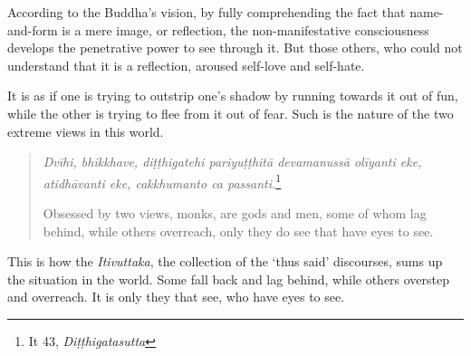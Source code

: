 According to the Buddha's vision, by fully comprehending the fact that name-and-form is a mere image, or reflection, the non-manifestative consciousness develops the penetrative power to see through it. But those others, who could not understand that it is a reflection, aroused self-love and self-hate.

It is as if one is trying to outstrip one's shadow by running towards it out of fun, while the other is trying to flee from it out of fear. Such is the nature of the two extreme views in this world.

\begin{quote}
\emph{Dvīhi, bhikkhave, diṭṭhigatehi pariyuṭṭhitā devamanussā olīyanti eke, atidhāvanti eke, cakkhumanto ca passanti.}\footnote{It 43, \emph{Diṭṭhigatasutta}}

Obsessed by two views, monks, are gods and men, some of whom lag behind, while others overreach, only they do see that have eyes to see.
\end{quote}

This is how the \emph{Itivuttaka}, the collection of the `thus said' discourses, sums up the situation in the world. Some fall back and lag behind, while others overstep and overreach. It is only they that see, who have eyes to see.
